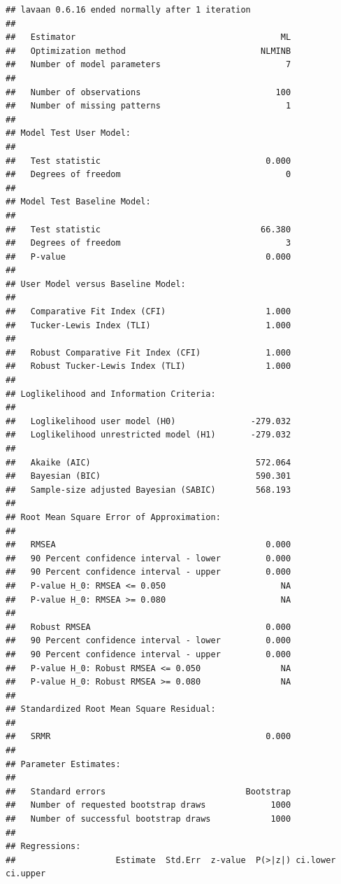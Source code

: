 \documentclass[
  11pt,
]{book}
\begin{document}
\begin{verbatim}
## lavaan 0.6.16 ended normally after 1 iteration
## 
##   Estimator                                         ML
##   Optimization method                           NLMINB
##   Number of model parameters                         7
## 
##   Number of observations                           100
##   Number of missing patterns                         1
## 
## Model Test User Model:
##                                                       
##   Test statistic                                 0.000
##   Degrees of freedom                                 0
## 
## Model Test Baseline Model:
## 
##   Test statistic                                66.380
##   Degrees of freedom                                 3
##   P-value                                        0.000
## 
## User Model versus Baseline Model:
## 
##   Comparative Fit Index (CFI)                    1.000
##   Tucker-Lewis Index (TLI)                       1.000
##                                                       
##   Robust Comparative Fit Index (CFI)             1.000
##   Robust Tucker-Lewis Index (TLI)                1.000
## 
## Loglikelihood and Information Criteria:
## 
##   Loglikelihood user model (H0)               -279.032
##   Loglikelihood unrestricted model (H1)       -279.032
##                                                       
##   Akaike (AIC)                                 572.064
##   Bayesian (BIC)                               590.301
##   Sample-size adjusted Bayesian (SABIC)        568.193
## 
## Root Mean Square Error of Approximation:
## 
##   RMSEA                                          0.000
##   90 Percent confidence interval - lower         0.000
##   90 Percent confidence interval - upper         0.000
##   P-value H_0: RMSEA <= 0.050                       NA
##   P-value H_0: RMSEA >= 0.080                       NA
##                                                       
##   Robust RMSEA                                   0.000
##   90 Percent confidence interval - lower         0.000
##   90 Percent confidence interval - upper         0.000
##   P-value H_0: Robust RMSEA <= 0.050                NA
##   P-value H_0: Robust RMSEA >= 0.080                NA
## 
## Standardized Root Mean Square Residual:
## 
##   SRMR                                           0.000
## 
## Parameter Estimates:
## 
##   Standard errors                            Bootstrap
##   Number of requested bootstrap draws             1000
##   Number of successful bootstrap draws            1000
## 
## Regressions:
##                    Estimate  Std.Err  z-value  P(>|z|) ci.lower ci.upper

\end{verbatim}
\end{document}
